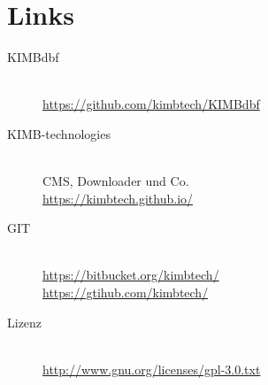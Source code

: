 \documentclass[paper=A4,pagesize=auto,12pt,headinclude=true,footinclude=true,BCOR=0mm,DIV=calc]{scrartcl}
\begin{document}
  \newpage
  \section{Links}
  
  \begin{description}
    \item[KIMBdbf] \hfill \\
          \href{https://github.com/kimbtech/KIMBdbf}{https://github.com/kimbtech/KIMBdbf}\\
    \item[KIMB-technologies] \hfill \\
	  CMS, Downloader und Co.\\
	  \href{https://kimbtech.github.io/}{https://kimbtech.github.io/}
    \item[GIT] \hfill \\
	  \href{https://bitbucket.org/kimbtech/}{https://bitbucket.org/kimbtech/}\\
	  \href{https://github.com/kimbtech/}{https://gtihub.com/kimbtech/}
    \item[Lizenz] \hfill \\
	\href{http://www.gnu.org/licenses/gpl-3.0.txt}{http://www.gnu.org/licenses/gpl-3.0.txt}
  \end{description}
\end{document}
